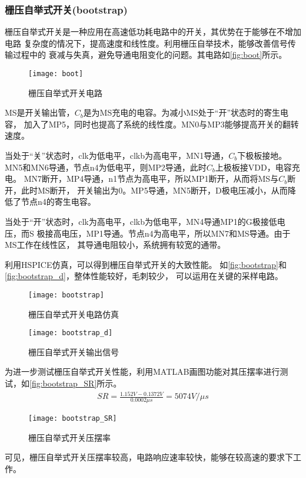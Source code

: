     \subsubsection{栅压自举式开关(bootstrap)}
    栅压自举式开关是一种应用在高速低功耗电路中的开关，其优势在于能够在不增加电路
    复杂度的情况下，提高速度和线性度。利用栅压自举技术，能够改善信号传输过程中的
    衰减与失真，避免导通电阻变化的问题。其电路如\autoref{fig:boot}所示。
    \begin{figure}[ht]
        \centering
        \texttt{[image: boot]}
        \caption{\label{fig:boot}栅压自举式开关电路}
    \end{figure}
    \par MS是开关输出管，$ C_b $是为MS充电的电容。为减小MS处于“开”状态时的寄生电容，
    加入了MP5，同时也提高了系统的线性度。MN0与MP3能够提高开关的翻转速度。
    \par 当处于“关”状态时，clk为低电平，clkb为高电平，MN1导通，$ C_b $下极板接地。
    MN5和MN6导通，节点n4为低电平，则MP2导通，此时$ C_b $上极板接VDD，电容充电。
    MN7断开，MP4导通，n1节点为高电平，所以MP1断开，从而将MS与$ C_b $断开，此时MS断开，
    开关输出为0。MP5导通，MN5断开，D极电压减小，从而降低了节点n4的寄生电容。
    \par 当处于“开”状态时，clk为高电平，clkb为低电平，MN4导通MP1的G极接低电压，而S
    极接高电压，MP1导通。节点n4为高电平，所以MN7和MS导通。由于MS工作在线性区，
    其导通电阻较小，系统拥有较宽的通带。
    \par 利用HSPICE仿真，可以得到栅压自举式开关的大致性能。
    如\autoref{fig:bootstrap}和\autoref{fig:bootstrap_d}，整体性能较好，毛刺较少，
    可以运用在关键的采样电路。
    \begin{figure}[H]
        \centering
        \texttt{[image: bootstrap]}
        \caption{\label{fig:bootstrap}栅压自举式开关电路仿真}
    \end{figure}
    \begin{figure}[H]
        \centering
        \texttt{[image: bootstrap\_d]}
        \caption{\label{fig:bootstrap_d}栅压自举式开关输出信号}
    \end{figure}
    \par 为进一步测试栅压自举式开关性能，利用MATLAB画图功能对其压摆率进行测试，如\autoref{fig:bootstrap_SR}所示。
    \begin{align}
        SR = \frac{1.152V-0.1372V}{0.0002\mu s} = 5074V/\mu s
    \end{align}
    \begin{figure}[ht]
        \centering
        \texttt{[image: bootstrap\_SR]}
        \caption{\label{fig:bootstrap_SR}栅压自举式开关压摆率}
    \end{figure}
    \par 可见，栅压自举式开关压摆率较高，电路响应速率较快，能够在较高速的要求下工作。

